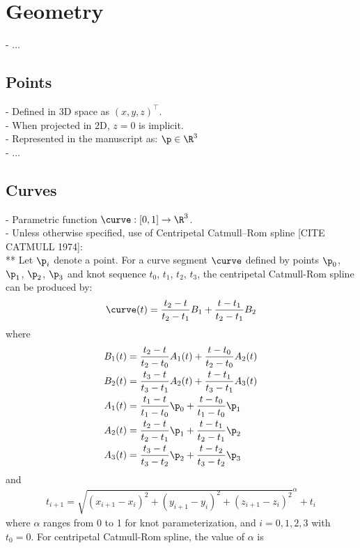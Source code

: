 \chapter{Geometry}
- ...

\section{Points}
- Defined in 3D space as $\left( x, y, z \right)^\intercal$. \\
- When projected in 2D, $z = 0$ is implicit. \\
- Represented in the manuscript as: $\p \in \R^3$ \\
- ...

\section{Curves}
- Parametric function $\curve: [0, 1] \to \R^3$. \\
- Unless otherwise specified, use of Centripetal Catmull–Rom spline [CITE CATMULL 1974]: \\
** Let $\p_i$ denote a point. For a curve segment $\curve$ defined by points $\p_0$, $\p_1$, $\p_2$, $\p_3$ and knot sequence $t_0$, $t_1$, $t_2$, $t_3$, the centripetal Catmull-Rom spline can be produced by:
\begin{align}
    \curve(t) = \frac{t_2 - t}{t_2 - t_1} B_1 + \frac{t - t_1}{t_2 - t_1} B_2
\end{align}
where
\begin{align}
    B_1(t) &= \frac {t_2 - t}{t_2 - t_0} A_1(t) + \frac{t - t_0}{t_2 - t_0} A_2(t) \\
    B_2(t) &= \frac{t_3 - t}{t_3 - t_1} A_2(t) + \frac{t - t_1}{t_3 - t_1} A_3(t) \\
    A_1(t) &= \frac{t_1 - t}{t_1 - t_0} \p_0 + \frac{t - t_0}{t_1 - t_0} \p_1 \\
    A_2(t) &= \frac{t_2 - t}{t_2 - t_1} \p_1 + \frac{t - t_1}{t_2 - t_1} \p_2 \\
    A_3(t) &= \frac{t_3 - t}{t_3 - t_2} \p_2 + \frac{t - t_2}{t_3 - t_2} \p_3
\end{align}
and
\begin{align}
    t_{i + 1} = \sqrt{ \left(x_{i+1} - x_i \right)^2 + \left(y_{i+1} - y_i \right)^2 +  \left(z_{i+1} - z_i \right)^2 }^\alpha + t_i
\end{align}
where $\alpha$ ranges from 0 to 1 for knot parameterization, and $i = 0, 1, 2, 3$ with $t_0 = 0$. For centripetal Catmull-Rom spline, the value of $\alpha$ is 
